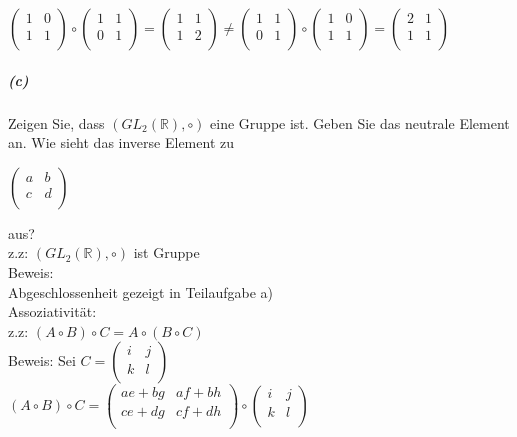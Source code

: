 \documentclass[paper=a4, fontsize=11pt]{scrartcl}
\numberwithin{equation}{section}
\numberwithin{figure}{section}
\numberwithin{table}{section}
\begin{document}
\begin{center}
$\begin{pmatrix}
1 & 0  \\
1 & 1  \\
\end{pmatrix} 
\circ
\begin{pmatrix}
1 & 1  \\
0 & 1  \\
\end{pmatrix}
=
\begin{pmatrix}
1 & 1 \\
1 & 2 \\
\end{pmatrix} 
\neq
\begin{pmatrix}
1 & 1  \\
0 & 1  \\
\end{pmatrix} 
\circ
\begin{pmatrix}
1 & 0  \\
1 & 1  \\
\end{pmatrix}
=
\begin{pmatrix}
2 & 1 \\
1 & 1 \\
\end{pmatrix}$
\end{center}


\subparagraph{(c)} 
Zeigen Sie, dass $(GL_{2}(\mathbb{R}), \circ)$ eine Gruppe ist. Geben Sie das neutrale Element an. Wie sieht das inverse Element zu

\begin{center}
$\begin{pmatrix}
a & b  \\
c & d  \\
\end{pmatrix} $
\end{center}

aus? \\

z.z: $(GL_{2}(\mathbb{R}), \circ)$ ist Gruppe \\
Beweis: \\
Abgeschlossenheit gezeigt in Teilaufgabe a) \\

Assoziativität: \\
z.z: $(A \circ B) \circ C = A \circ (B \circ C)$ \\
Beweis: Sei $C=
\begin{pmatrix}
i & j  \\
k & l  \\
\end{pmatrix} $ \\
$(A \circ B) \circ C =
\begin{pmatrix}
ae+bg & af+bh  \\
ce+dg & cf+dh  \\
\end{pmatrix} 
\circ
\begin{pmatrix}
i & j  \\
k & l  \\
\end{pmatrix} $ \\
\end{document}
